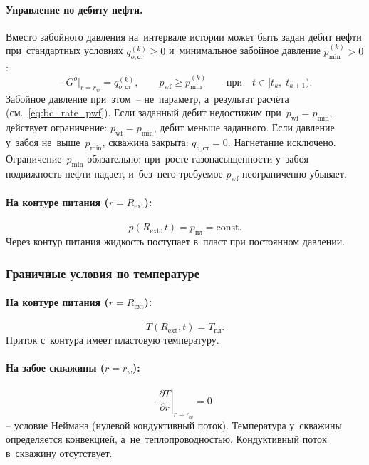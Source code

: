 \documentclass[12pt,a4paper]{article}
\newcommand{\rw}{r_w}
\newcommand{\Rext}{R_{\mathrm{ext}}}
\newcommand{\ppl}{p_{\text{пл}}}
\newcommand{\pwf}{p_{\mathrm{wf}}}
\newcommand{\Tpl}{T_{\text{пл}}}
\newcommand{\pdr}[1]{\frac{\partial #1}{\partial r}}
\begin{document}
\paragraph{Управление по дебиту нефти.}
Вместо забойного давления на~интервале истории может быть задан
дебит нефти при~стандартных условиях $q_{o,\text{ст}}^{(k)} \ge 0$
и~минимальное забойное давление $p_{\min}^{(k)} > 0$:
\begin{equation}\label{eq:bc_rate_well}
  -G^{o}\big|_{r = \rw} = q_{o,\text{ст}}^{(k)},
  \qquad \pwf \ge p_{\min}^{(k)}
  \qquad\text{при}\quad t \in [t_k,\; t_{k+1}).
\end{equation}
Забойное давление при~этом~-- не~параметр, а~результат расчёта
(см.~\eqref{eq:bc_rate_pwf}). Если заданный дебит недостижим
при~$\pwf = p_{\min}$, действует ограничение: $\pwf = p_{\min}$,
дебит меньше заданного. Если давление у~забоя не~выше~$p_{\min}$,
скважина закрыта: $q_{o,\text{ст}} = 0$. Нагнетание исключено.
Ограничение~$p_{\min}$ обязательно: при~росте газонасыщенности
у~забоя подвижность нефти падает, и~без~него требуемое $\pwf$
неограниченно убывает.

\paragraph{На контуре питания ($r = \Rext$):}
\begin{equation}\label{eq:bc_p_ext}
  p(\Rext, t) = \ppl = \mathrm{const}.
\end{equation}
Через контур питания жидкость поступает в~пласт при постоянном давлении.


\subsubsection{Граничные условия по температуре}\label{sssec:bc_T}

\paragraph{На контуре питания ($r = \Rext$):}
\begin{equation}\label{eq:bc_T_ext}
  T(\Rext, t) = \Tpl.
\end{equation}
Приток с~контура имеет пластовую температуру.

\paragraph{На забое скважины ($r = \rw$):}
\begin{equation}\label{eq:bc_T_well}
  \left.\pdr{T}\right|_{r = \rw} = 0
\end{equation}
-- условие Неймана (нулевой кондуктивный поток). Температура
у~скважины определяется конвекцией, а~не~теплопроводностью.
Кондуктивный поток в~скважину отсутствует.
\end{document}
